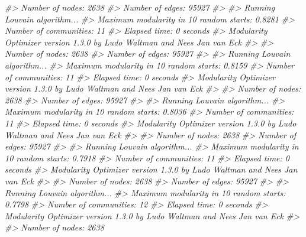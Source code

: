 \documentclass[
]{book}
\newenvironment{Shaded}{\begin{snugshade}}{\end{snugshade}}
\newcommand{\CommentTok}[1]{\textcolor[rgb]{0.56,0.35,0.01}{\textit{#1}}}
\begin{document}
\begin{Shaded}
\begin{Highlighting}[]
\CommentTok{\#\textgreater{} Number of nodes: 2638}
\CommentTok{\#\textgreater{} Number of edges: 95927}
\CommentTok{\#\textgreater{} }
\CommentTok{\#\textgreater{} Running Louvain algorithm...}
\CommentTok{\#\textgreater{} Maximum modularity in 10 random starts: 0.8281}
\CommentTok{\#\textgreater{} Number of communities: 11}
\CommentTok{\#\textgreater{} Elapsed time: 0 seconds}
\CommentTok{\#\textgreater{} Modularity Optimizer version 1.3.0 by Ludo Waltman and Nees Jan van Eck}
\CommentTok{\#\textgreater{} }
\CommentTok{\#\textgreater{} Number of nodes: 2638}
\CommentTok{\#\textgreater{} Number of edges: 95927}
\CommentTok{\#\textgreater{} }
\CommentTok{\#\textgreater{} Running Louvain algorithm...}
\CommentTok{\#\textgreater{} Maximum modularity in 10 random starts: 0.8159}
\CommentTok{\#\textgreater{} Number of communities: 11}
\CommentTok{\#\textgreater{} Elapsed time: 0 seconds}
\CommentTok{\#\textgreater{} Modularity Optimizer version 1.3.0 by Ludo Waltman and Nees Jan van Eck}
\CommentTok{\#\textgreater{} }
\CommentTok{\#\textgreater{} Number of nodes: 2638}
\CommentTok{\#\textgreater{} Number of edges: 95927}
\CommentTok{\#\textgreater{} }
\CommentTok{\#\textgreater{} Running Louvain algorithm...}
\CommentTok{\#\textgreater{} Maximum modularity in 10 random starts: 0.8036}
\CommentTok{\#\textgreater{} Number of communities: 11}
\CommentTok{\#\textgreater{} Elapsed time: 0 seconds}
\CommentTok{\#\textgreater{} Modularity Optimizer version 1.3.0 by Ludo Waltman and Nees Jan van Eck}
\CommentTok{\#\textgreater{} }
\CommentTok{\#\textgreater{} Number of nodes: 2638}
\CommentTok{\#\textgreater{} Number of edges: 95927}
\CommentTok{\#\textgreater{} }
\CommentTok{\#\textgreater{} Running Louvain algorithm...}
\CommentTok{\#\textgreater{} Maximum modularity in 10 random starts: 0.7918}
\CommentTok{\#\textgreater{} Number of communities: 11}
\CommentTok{\#\textgreater{} Elapsed time: 0 seconds}
\CommentTok{\#\textgreater{} Modularity Optimizer version 1.3.0 by Ludo Waltman and Nees Jan van Eck}
\CommentTok{\#\textgreater{} }
\CommentTok{\#\textgreater{} Number of nodes: 2638}
\CommentTok{\#\textgreater{} Number of edges: 95927}
\CommentTok{\#\textgreater{} }
\CommentTok{\#\textgreater{} Running Louvain algorithm...}
\CommentTok{\#\textgreater{} Maximum modularity in 10 random starts: 0.7798}
\CommentTok{\#\textgreater{} Number of communities: 12}
\CommentTok{\#\textgreater{} Elapsed time: 0 seconds}
\CommentTok{\#\textgreater{} Modularity Optimizer version 1.3.0 by Ludo Waltman and Nees Jan van Eck}
\CommentTok{\#\textgreater{} }
\CommentTok{\#\textgreater{} Number of nodes: 2638}

\end{Highlighting}
\end{Shaded}
\end{document}
